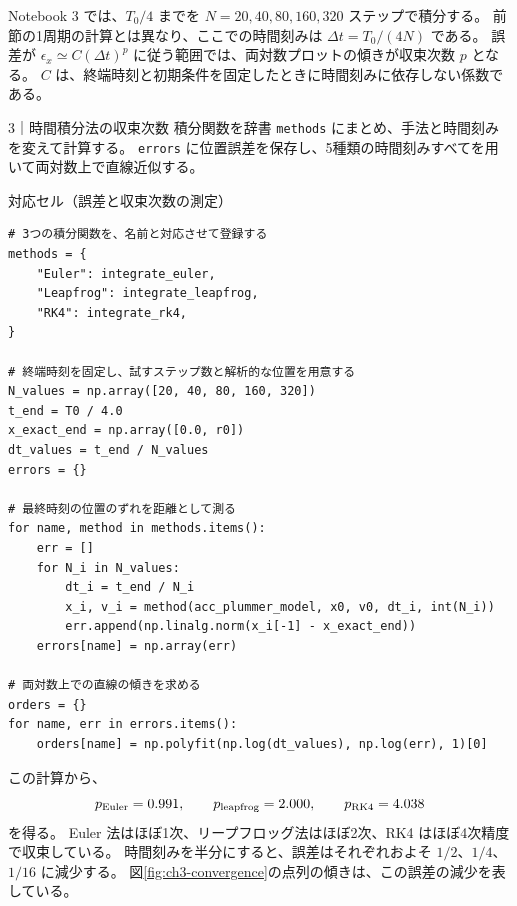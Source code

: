 Notebook 3 では、$T_0/4$ までを $N=20,40,80,160,320$ ステップで積分する。
前節の1周期の計算とは異なり、ここでの時間刻みは $\Delta t=T_0/(4N)$ である。
誤差が $\epsilon_x\simeq C(\Delta t)^p$ に従う範囲では、両対数プロットの傾きが収束次数 $p$ となる。
$C$ は、終端時刻と初期条件を固定したときに時間刻みに依存しない係数である。
\begin{notebookblock}{3｜時間積分法の収束次数}
積分関数を辞書 \texttt{methods} にまとめ、手法と時間刻みを変えて計算する。
\texttt{errors} に位置誤差を保存し、5種類の時間刻みすべてを用いて両対数上で直線近似する。

\par\smallskip\noindent\begin{minipage}{\linewidth}
{\sffamily\small\color{graytext}対応セル（誤差と収束次数の測定）}
\begin{Verbatim}[xleftmargin=2mm,fontsize=\small,frame=single,framesep=1.8mm,framerule=0.35pt,rulecolor=\color{listingframe},fillcolor=\color{listingbg}]
# 3つの積分関数を、名前と対応させて登録する
methods = {
    "Euler": integrate_euler,
    "Leapfrog": integrate_leapfrog,
    "RK4": integrate_rk4,
}

# 終端時刻を固定し、試すステップ数と解析的な位置を用意する
N_values = np.array([20, 40, 80, 160, 320])
t_end = T0 / 4.0
x_exact_end = np.array([0.0, r0])
dt_values = t_end / N_values
errors = {}

# 最終時刻の位置のずれを距離として測る
for name, method in methods.items():
    err = []
    for N_i in N_values:
        dt_i = t_end / N_i
        x_i, v_i = method(acc_plummer_model, x0, v0, dt_i, int(N_i))
        err.append(np.linalg.norm(x_i[-1] - x_exact_end))
    errors[name] = np.array(err)

# 両対数上での直線の傾きを求める
orders = {}
for name, err in errors.items():
    orders[name] = np.polyfit(np.log(dt_values), np.log(err), 1)[0]
\end{Verbatim}
\end{minipage}
\end{notebookblock}

この計算から、
\begin{equation}
 p_{\rm Euler}=0.991,\qquad
 p_{\rm leapfrog}=2.000,\qquad
 p_{\rm RK4}=4.038
\label{eq:ch3-orders}
\end{equation}
を得る。
Euler 法はほぼ1次、リープフロッグ法はほぼ2次、RK4 はほぼ4次精度で収束している。
時間刻みを半分にすると、誤差はそれぞれおよそ $1/2$、$1/4$、$1/16$ に減少する。
図\ref{fig:ch3-convergence}の点列の傾きは、この誤差の減少を表している。

